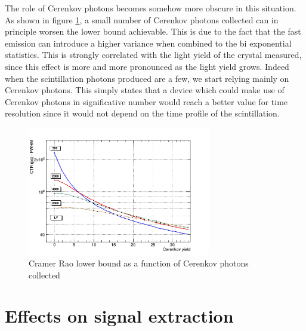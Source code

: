 The role of Cerenkov photons becomes somehow more obscure in this situation. As shown in figure \ref{fig:cramer_cer}, a small number of Cerenkov photons collected can in principle worsen the lower bound achievable. This is due to the fact that the fast emission can introduce a higher variance when combined to the bi exponential statistics. This is strongly correlated with the light yield of the crystal measured, since this effect is more and more pronounced as the light yield grows. Indeed when the scintillation photons produced are a few, we start relying mainly on Cerenkov photons. This simply states that a device which could make use of Cerenkov photons in significative number would reach a better value for time resolution since it would not depend on the time profile of the scintillation.
\begin{figure}[htbp]
\begin{center}
\includegraphics[width=8cm]{../Pictures/Chapter_4/CY_LY_cramer_rao.png}
\end{center}
\caption[Cramer Rao evolution - Cerenkov]{Cramer Rao lower bound as a function of Cerenkov photons collected}
\label{fig:cramer_cer}
\end{figure}

\section{Effects on signal extraction}

